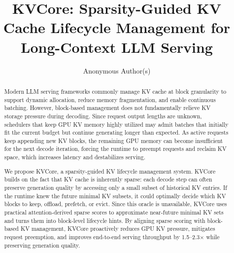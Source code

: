 \documentclass[sigplan,10pt,review,anonymous]{acmart}
\begin{document}

\title{KVCore: Sparsity-Guided KV Cache Lifecycle Management for Long-Context LLM Serving}

\author{Anonymous Author(s)}
\renewcommand{\shortauthors}{Anonymous et al.}

\begin{abstract}

Modern LLM serving frameworks commonly manage KV cache at block granularity to support dynamic allocation, reduce memory fragmentation, and enable continuous batching. However, block-based management does not fundamentally relieve KV storage pressure during decoding. Since request output lengths are unknown, schedulers that keep GPU KV memory highly utilized may admit batches that initially fit the current budget but continue generating longer than expected. As active requests keep appending new KV blocks, the remaining GPU memory can become insufficient for the next decode iteration, forcing the runtime to preempt requests and reclaim KV space, which increases latency and destabilizes serving.

We propose KVCore, a sparsity-guided KV lifecycle management system. KVCore builds on the fact that KV cache is inherently sparse: each decode step can often preserve generation quality by accessing only a small subset of historical KV entries. If the runtime knew the future minimal KV subsets, it could optimally decide which KV blocks to keep, offload, prefetch, or evict. Since this oracle is unavailable, KVCore uses practical attention-derived sparse scores to approximate near-future minimal KV sets and turns them into block-level lifecycle hints. By aligning sparse scoring with block-based KV management, KVCore proactively reduces GPU KV pressure, mitigates request preemption, and improves end-to-end serving throughput by 1.5--2.3$\times$ while preserving generation quality.
\end{abstract}
\end{document}
